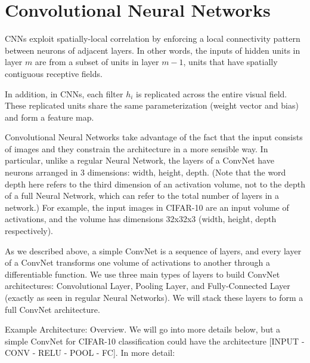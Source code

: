 \documentclass[11pt]{article}
\newcommand*{\titleGM}{\begingroup %
\hbox{ %
\hspace*{0.2\textwidth} %
\rule{1pt}{\textheight} %
\hspace*{0.05\textwidth} %
\parbox[b]{0.75\textwidth}{ %

{\noindent\Huge\bfseries  Neural data analysis}\\[2\baselineskip] %
{\large \textit{Notes}}\\[4\baselineskip] %
{\Large \textsc{Athul Vijayan \hspace{5pt} ed11b004}} %

\vspace{0.5\textheight} %
}}
\endgroup}
\begin{document}
\tableofcontents

\newpage
\section{Convolutional Neural Networks} %
CNNs exploit spatially-local correlation by enforcing a local connectivity pattern between neurons of adjacent layers. In other words, the inputs of hidden units in layer $m$ are from a subset of units in layer $m-1$, units that have spatially contiguous receptive fields.

In addition, in CNNs, each filter $h_i$ is replicated across the entire visual field. These replicated units share the same parameterization (weight vector and bias) and form a feature map.

Convolutional Neural Networks take advantage of the fact that the input consists of images and they constrain the architecture in a more sensible way. In particular, unlike a regular Neural Network, the layers of a ConvNet have neurons arranged in 3 dimensions: width, height, depth. (Note that the word depth here refers to the third dimension of an activation volume, not to the depth of a full Neural Network, which can refer to the total number of layers in a network.) For example, the input images in CIFAR-10 are an input volume of activations, and the volume has dimensions 32x32x3 (width, height, depth respectively).

As we described above, a simple ConvNet is a sequence of layers, and every layer of a ConvNet transforms one volume of activations to another through a differentiable function. We use three main types of layers to build ConvNet architectures: Convolutional Layer, Pooling Layer, and Fully-Connected Layer (exactly as seen in regular Neural Networks). We will stack these layers to form a full ConvNet architecture.

Example Architecture: Overview. We will go into more details below, but a simple ConvNet for CIFAR-10 classification could have the architecture [INPUT - CONV - RELU - POOL - FC]. In more detail:
\end{document}
